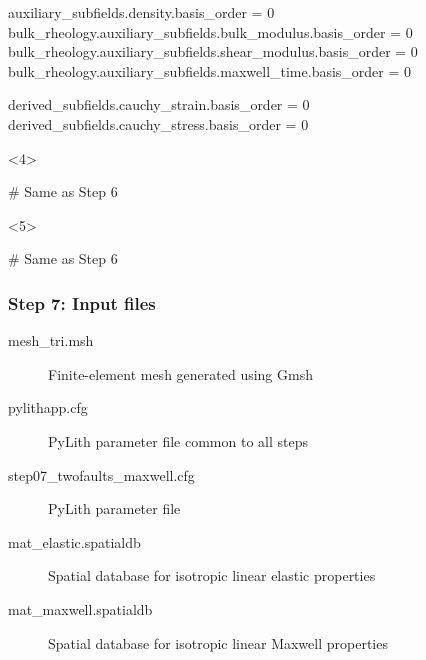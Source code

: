 \documentclass[aspectratio=169]{beamer}
\begin{document}
\begin{frame}[t,fragile]
\begin{minipage}[t]{0.67\textwidth}
\begin{onlyenv}
\begin{cfgcode}
        auxiliary_subfields.density.basis_order = 0
        bulk_rheology.auxiliary_subfields.bulk_modulus.basis_order = 0
        bulk_rheology.auxiliary_subfields.shear_modulus.basis_order = 0
        bulk_rheology.auxiliary_subfields.maxwell_time.basis_order = 0
        
        derived_subfields.cauchy_strain.basis_order = 0
        derived_subfields.cauchy_stress.basis_order = 0
      \end{cfgcode}
    \end{onlyenv}
    \begin{onlyenv}<4>
      \begin{cfgcode}
        # Same as Step 6
      \end{cfgcode}
    \end{onlyenv}
    \begin{onlyenv}<5>
      \begin{cfgcode}
        # Same as Step 6
      \end{cfgcode}
    \end{onlyenv}
  \end{minipage}

  
\end{frame}


\begin{frame}
  \frametitle{Step 7: Input files}
  \summary{}

  \begin{description}
  \item[mesh\_tri.msh] Finite-element mesh generated using Gmsh
  \item[pylithapp.cfg] PyLith parameter file common to all steps
  \item[step07\_twofaults\_maxwell.cfg] PyLith parameter file
  \item[mat\_elastic.spatialdb] Spatial database for isotropic linear elastic properties
  \item[mat\_maxwell.spatialdb] Spatial database for isotropic linear Maxwell properties
  \end{description}
    
\end{frame}
\end{document}
